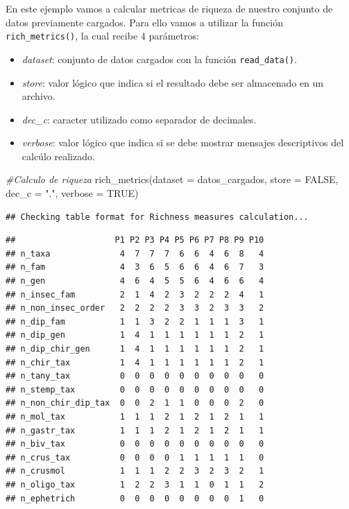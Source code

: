 \documentclass[
]{book}
\newenvironment{Shaded}{\begin{snugshade}}{\end{snugshade}}
\newcommand{\AttributeTok}[1]{\textcolor[rgb]{0.77,0.63,0.00}{#1}}
\newcommand{\CommentTok}[1]{\textcolor[rgb]{0.56,0.35,0.01}{\textit{#1}}}
\newcommand{\ConstantTok}[1]{\textcolor[rgb]{0.00,0.00,0.00}{#1}}
\newcommand{\FunctionTok}[1]{\textcolor[rgb]{0.00,0.00,0.00}{#1}}
\newcommand{\NormalTok}[1]{#1}
\newcommand{\StringTok}[1]{\textcolor[rgb]{0.31,0.60,0.02}{#1}}
\providecommand{\tightlist}{%
  \setlength{\itemsep}{0pt}\setlength{\parskip}{0pt}}
\begin{document}
En este ejemplo vamos a calcular metricas de riqueza de nuestro conjunto de datos previamente cargados.
Para ello vamos a utilizar la función \texttt{rich\_metrics()}, la cual recibe 4 parámetros:

\begin{itemize}
\tightlist
\item
  \emph{dataset}: conjunto de datos cargados con la función \texttt{read\_data()}.
\item
  \emph{store}: valor lógico que indica si el resultado debe ser almacenado en un archivo.
\item
  \emph{dec\_c}: caracter utilizado como separador de decimales.
\item
  \emph{verbose}: valor lógico que indica si se debe mostrar mensajes descriptivos del calcúlo realizado.
\end{itemize}

\begin{Shaded}
\begin{Highlighting}[]
\CommentTok{\#Calculo de riqueza}
\FunctionTok{rich\_metrics}\NormalTok{(}\AttributeTok{dataset =}\NormalTok{ datos\_cargados, }\AttributeTok{store =} \ConstantTok{FALSE}\NormalTok{, }\AttributeTok{dec\_c =} \StringTok{"."}\NormalTok{, }\AttributeTok{verbose =} \ConstantTok{TRUE}\NormalTok{)}
\end{Highlighting}
\end{Shaded}

\begin{verbatim}
## Checking table format for Richness measures calculation...
\end{verbatim}

\begin{verbatim}
##                    P1 P2 P3 P4 P5 P6 P7 P8 P9 P10
## n_taxa              4  7  7  7  6  6  4  6  8   4
## n_fam               4  3  6  5  6  6  4  6  7   3
## n_gen               4  6  4  5  5  6  4  6  6   4
## n_insec_fam         2  1  4  2  3  2  2  2  4   1
## n_non_insec_order   2  2  2  2  3  3  2  3  3   2
## n_dip_fam           1  1  3  2  2  1  1  1  3   1
## n_dip_gen           1  4  1  1  1  1  1  1  2   1
## n_dip_chir_gen      1  4  1  1  1  1  1  1  2   1
## n_chir_tax          1  4  1  1  1  1  1  1  2   1
## n_tany_tax          0  0  0  0  0  0  0  0  0   0
## n_stemp_tax         0  0  0  0  0  0  0  0  0   0
## n_non_chir_dip_tax  0  0  2  1  1  0  0  0  2   0
## n_mol_tax           1  1  1  2  1  2  1  2  1   1
## n_gastr_tax         1  1  1  2  1  2  1  2  1   1
## n_biv_tax           0  0  0  0  0  0  0  0  0   0
## n_crus_tax          0  0  0  0  1  1  1  1  1   0
## n_crusmol           1  1  1  2  2  3  2  3  2   1
## n_oligo_tax         1  2  2  3  1  1  0  1  1   2
## n_ephetrich         0  0  0  0  0  0  0  0  1   0
\end{verbatim}
\end{document}
